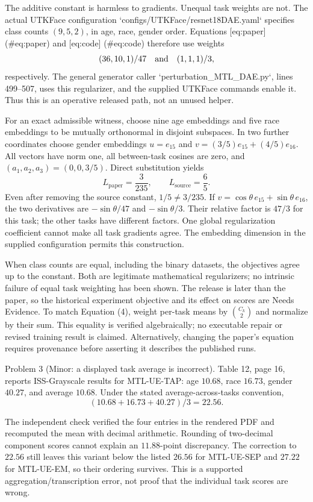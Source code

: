 \documentclass[10pt]{article}
\begin{document}
The additive constant is harmless to gradients. Unequal task weights are not. The actual UTKFace configuration `configs/UTKFace/resnet18DAE.yaml` specifies class counts \((9,5,2)\), in age, race, gender order. Equations [eq:paper] (\#eq:paper) and [eq:code] (\#eq:code) therefore use weights \[(36,10,1)/47
 \quad\hbox{and}\quad
 (1,1,1)/3,\] respectively. The general generator caller `perturbation\_MTL\_DAE.py`, lines 499–507, uses this regularizer, and the supplied UTKFace commands enable it. Thus this is an operative released path, not an unused helper.\par
For an exact admissible witness, choose nine age embeddings and five race embeddings to be mutually orthonormal in disjoint subspaces. In two further coordinates choose gender embeddings \(u=e_{15}\) and \(v=(3/5)e_{15}+(4/5)e_{16}\). All vectors have norm one, all between-task cosines are zero, and \((a_1,a_2,a_3)=(0,0,3/5)\). Direct substitution yields \[L_{\mathrm{paper}}=\frac3{235},
 \qquad L_{\mathrm{source}}=\frac65.\] Even after removing the source constant, \(1/5\ne3/235\). If \(v=\cos\theta\,e_{15}+\sin\theta\,e_{16}\), the two derivatives are \(-\sin\theta/47\) and \(-\sin\theta/3\). Their relative factor is \(47/3\) for this task; the other tasks have different factors. One global regularization coefficient cannot make all task gradients agree. The embedding dimension in the supplied configuration permits this construction.\par
When class counts are equal, including the binary datasets, the objectives agree up to the constant. Both are legitimate mathematical regularizers; no intrinsic failure of equal task weighting has been shown. The release is later than the paper, so the historical experiment objective and its effect on scores are Needs Evidence. To match Equation (4), weight per-task means by \(\binom{C_k}{2}\) and normalize by their sum. This equality is verified algebraically; no executable repair or revised training result is claimed. Alternatively, changing the paper’s equation requires provenance before asserting it describes the published runs.\par
Problem 3 (Minor: a displayed task average is incorrect).  Table 12, page 16, reports ISS-Grayscale results for MTL-UE-TAP: age \(10.68\), race \(16.73\), gender \(40.27\), and average \(10.68\). Under the stated average-across-tasks convention, \[(10.68+16.73+40.27)/3=22.56.\]\par
The independent check verified the four entries in the rendered PDF and recomputed the mean with decimal arithmetic. Rounding of two-decimal component scores cannot explain an \(11.88\)-point discrepancy. The correction to \(22.56\) still leaves this variant below the listed \(26.56\) for MTL-UE-SEP and \(27.22\) for MTL-UE-EM, so their ordering survives. This is a supported aggregation/transcription error, not proof that the individual task scores are wrong.\par
\end{document}
